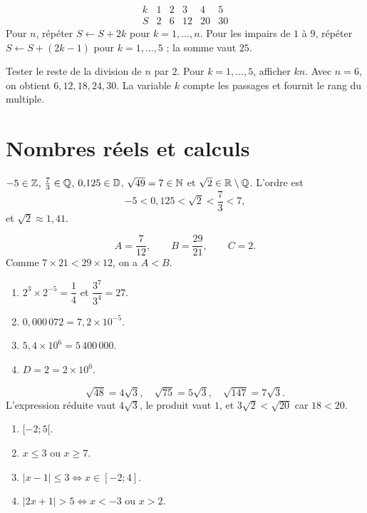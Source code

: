 \[
\begin{array}{c|ccccc}
k&1&2&3&4&5\\ \hline
S&2&6&12&20&30
\end{array}
\]
Pour $n$, répéter $S\leftarrow S+2k$ pour $k=1,\ldots,n$. Pour les impairs
de $1$ à $9$, répéter $S\leftarrow S+(2k-1)$ pour $k=1,\ldots,5$ ;
la somme vaut $25$.

Tester le reste de la division de $n$ par $2$. Pour $k=1,\ldots,5$, afficher
$kn$. Avec $n=6$, on obtient $6,12,18,24,30$. La variable $k$ compte les
passages et fournit le rang du multiple.

\section*{Nombres réels et calculs}

$-5\in\mathbb{Z}$, $\frac73\in\mathbb{Q}$, $0{,}125\in\mathbb{D}$, $\sqrt{49}=7\in\mathbb{N}$ et
$\sqrt2\in\mathbb{R}\setminus\mathbb{Q}$. L'ordre est
\[
 -5<0{,}125<\sqrt2<\frac73<7,
\]
et $\sqrt2\approx1{,}41$.

\[
 A=\frac7{12},\qquad B=\frac{29}{21},\qquad C=2.
\]
Comme $7\times21<29\times12$, on a $A<B$.

\begin{enumerate}
  \item $2^3\times2^{-5}=\dfrac14$ et $\dfrac{3^7}{3^4}=27$.
  \item $0{,}000\,072=7{,}2\times10^{-5}$.
  \item $5{,}4\times10^6=5\,400\,000$.
  \item $D=2=2\times10^0$.
\end{enumerate}

\[
\sqrt{48}=4\sqrt3,\quad \sqrt{75}=5\sqrt3,\quad \sqrt{147}=7\sqrt3.
\]
L'expression réduite vaut $4\sqrt3$, le produit vaut $1$, et
$3\sqrt2<\sqrt{20}$ car $18<20$.

\begin{enumerate}
  \item $[-2;5[$.
  \item $x\leq3$ ou $x\geq7$.
  \item $|x-1|\leq3\iff x\in[-2;4]$.
  \item $|2x+1|>5\iff x<-3$ ou $x>2$.
\end{enumerate}

